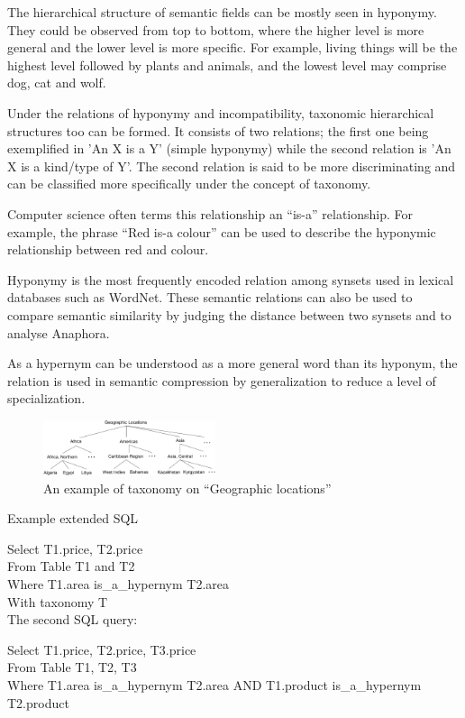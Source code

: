 \documentclass{sig-alternate}
\begin{document}
The hierarchical structure of semantic fields can be mostly seen in hyponymy. They could be observed from top to bottom, where the higher level is more general and the lower level is more specific. For example, living things will be the highest level followed by plants and animals, and the lowest level may comprise dog, cat and wolf.

Under the relations of hyponymy and incompatibility, taxonomic hierarchical structures too can be formed. It consists of two relations; the first one being exemplified in 'An X is a Y' (simple hyponymy) while the second relation is 'An X is a kind/type of Y'. The second relation is said to be more discriminating and can be classified more specifically under the concept of taxonomy.

Computer science often terms this relationship an ``is-a'' relationship. For example, the phrase ``Red is-a colour'' can be used to describe the hyponymic relationship between red and colour.

Hyponymy is the most frequently encoded relation among synsets used in lexical databases such as WordNet. These semantic relations can also be used to compare semantic similarity by judging the distance between two synsets and to analyse Anaphora.

As a hypernym can be understood as a more general word than its hyponym, the relation is used in semantic compression by generalization to reduce a level of specialization.

\begin{figure}[t]
\centering
\includegraphics[width=0.45\textwidth]{figures/taxonomy}
 \caption{An example of taxonomy on ``\textsf{Geographic locations}''}
\label{fig:taxonomy}
\end{figure}

Example extended SQL

Select  T1.price, T2.price \\
From Table T1 and T2 \\
Where T1.area is\_a\_hypernym T2.area \\
With taxonomy T \\


The second SQL query:

Select  T1.price, T2.price, T3.price \\
From Table T1, T2, T3 \\
Where T1.area is\_a\_hypernym T2.area AND T1.product is\_a\_hypernym T2.product
\end{document}
